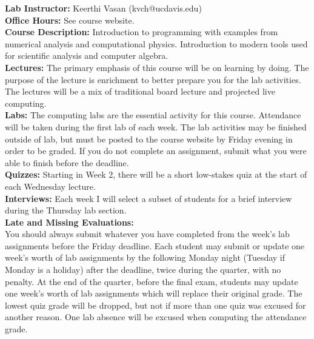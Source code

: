 \documentclass[12pt]{article}
\begin{document}
\textbf{Lab Instructor:} Keerthi Vasan (kvch@ucdavis.edu) \\

\noindent
\textbf{Office Hours:} See course website.\\

\noindent
\textbf {Course Description:}  
Introduction to programming with examples from numerical analysis and
computational physics. Introduction to modern tools used for
scientific analysis and computer algebra.\\

\noindent \textbf{Lectures:} 
The primary emphasis of this course will be on learning by doing.  The
purpose of the lecture is enrichment to better prepare you for the lab
activities.  The lectures will be a mix of traditional board lecture
and projected live computing.\\

\noindent 
\textbf{Labs:} The computing labs are the essential activity
for this course.  Attendance will be taken during the first lab of
each week.  The lab activities may be finished outside of lab, but
must be posted to the course website by Friday evening in order to be
graded.  If you do not complete an assignment, submit what you were
able to finish before the deadline.\\

\noindent
\textbf{Quizzes:} Starting in Week 2, there will be a short low-stakes
quiz at the start of each Wednesday lecture.  \\

\noindent
\textbf{Interviews:} Each week I will select a subset of students for
a brief interview during the Thursday lab section. \\

\noindent \textbf{Late and Missing Evaluations:}\\ 
You should always submit whatever you have completed from the week's
lab assignments before the Friday deadline.  Each student may submit
or update one week's worth of lab assignments by the following Monday
night (Tuesday if Monday is a holiday) after the deadline, twice
during the quarter, with no penalty.  At the end of the quarter,
before the final exam, students may update one week's worth of lab
assignments which will replace their original grade.  The lowest quiz
grade will be dropped, but not if more than one quiz was excused for
another reason.  One lab absence will be excused when computing the
attendance grade.\\
\end{document}
